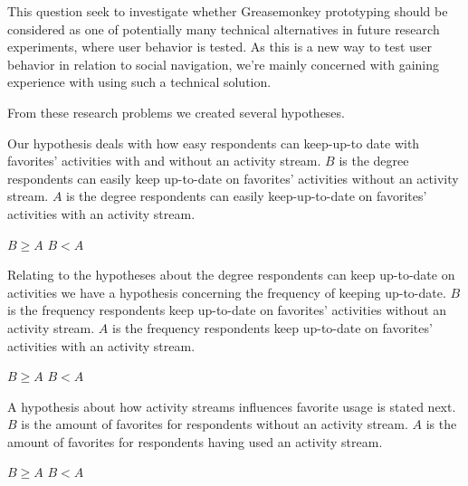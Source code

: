 This question seek to investigate whether Greasemonkey prototyping should be
considered as one of potentially many technical alternatives in future
research experiments, where user behavior is tested. As this is a new way
to test user behavior in relation to social navigation, we're mainly concerned
with gaining experience with using such a technical solution.

\parabreak

From these research problems we created several hypotheses.

Our  hypothesis deals with how easy respondents can keep-up-to
date with favorites' activities with and without an 
activity stream.
$B$ is the degree respondents can easily keep up-to-date on
favorites' activities without an activity stream. $A$ is the degree
respondents can easily keep-up-to-date on favorites' activities  with
an activity stream.
\begin{items}
   $B \geq A$
   $B < A$
\end{items}

Relating to the hypotheses about the degree respondents can keep
up-to-date on activities we have a  hypothesis concerning
the frequency of keeping up-to-date.
$B$ is the frequency respondents keep up-to-date on favorites' activities
without an activity stream. $A$ is the frequency respondents keep
up-to-date on favorites' activities with an activity stream.
\begin{items}
   $B \geq A$
   $B < A$
\end{items}

A  hypothesis about how activity streams influences favorite usage is
stated next.
$B$ is the amount of favorites for respondents without an activity stream.
$A$ is the amount of favorites for respondents having used an activity
stream.
\begin{items}
   $B \geq A$
   $B < A$
\end{items}
